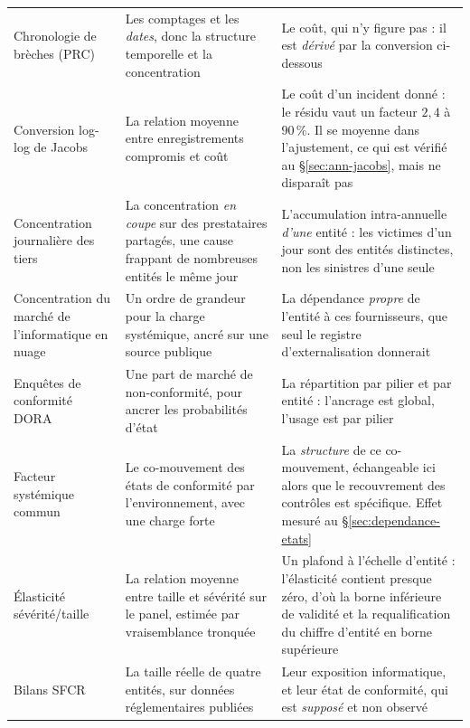 {\begin{longtable}{@{}>{\raggedright\arraybackslash}p{3.1cm}
                    >{\raggedright\arraybackslash}p{5.4cm}
                    >{\raggedright\arraybackslash}p{5.6cm}@{}}
Chronologie de brèches (PRC) &
Les comptages et les \emph{dates}, donc la structure temporelle et la concentration &
Le coût, qui n'y figure pas : il est \emph{dérivé} par la conversion ci-dessous \\

Conversion log-log de Jacobs &
La relation moyenne entre enregistrements compromis et coût &
Le coût d'un incident donné : le résidu vaut un facteur $2{,}4$ à $90\,\%$. Il se moyenne dans
l'ajustement, ce qui est vérifié au \S\ref{sec:ann-jacobs}, mais ne disparaît pas \\

Concentration journalière des tiers &
La concentration \emph{en coupe} sur des prestataires partagés, une cause frappant de nombreuses
entités le même jour &
L'accumulation intra-annuelle \emph{d'une} entité : les victimes d'un jour sont des entités
distinctes, non les sinistres d'une seule \\

Concentration du marché de l'informatique en nuage &
Un ordre de grandeur pour la charge systémique, ancré sur une source publique &
La dépendance \emph{propre} de l'entité à ces fournisseurs, que seul le registre
d'externalisation donnerait \\

Enquêtes de conformité DORA &
Une part de marché de non-conformité, pour ancrer les probabilités d'état &
La répartition par pilier et par entité : l'ancrage est global, l'usage est par pilier \\

Facteur systémique commun &
Le co-mouvement des états de conformité par l'environnement, avec une charge forte &
La \emph{structure} de ce co-mouvement, échangeable ici alors que le recouvrement des contrôles
est spécifique. Effet mesuré au \S\ref{sec:dependance-etats} \\

Élasticité sévérité/taille &
La relation moyenne entre taille et sévérité sur le panel, estimée par vraisemblance tronquée &
Un plafond à l'échelle d'entité : l'élasticité contient presque zéro, d'où la borne inférieure
de validité et la requalification du chiffre d'entité en borne supérieure \\

Bilans SFCR &
La taille réelle de quatre entités, sur données réglementaires publiées &
Leur exposition informatique, et leur état de conformité, qui est \emph{supposé} et non observé \\


\end{longtable}}
